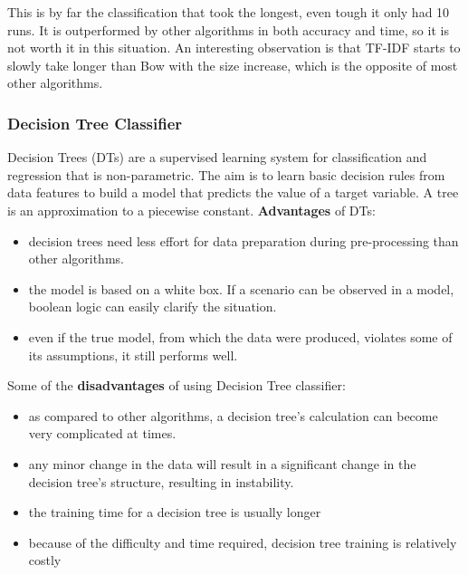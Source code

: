 \documentclass{article}
\begin{document}
	\par This is by far the classification that took the longest, even tough it only had 10 runs. It is outperformed by other algorithms in both accuracy and time, so it is not worth it in this situation. An interesting observation is that TF-IDF starts to slowly take longer than Bow with the size increase, which is the opposite of most other algorithms. 

	\subsubsection{Decision Tree Classifier}
	Decision Trees (DTs) are a supervised learning system for classification and regression that is non-parametric. The aim is to learn basic decision rules from data features to build a model that predicts the value of a target variable. A tree is an approximation to a piecewise constant.
	\textbf{Advantages} of DTs:
\begin{itemize}
\item decision trees need less effort for data preparation during pre-processing than other algorithms.
\item the model is based on a white box. If a scenario can be observed in a model, boolean logic can easily clarify the situation.
\item even if the true model, from which the data were produced, violates some of its assumptions, it still performs well.
\end{itemize}
Some of the \textbf{disadvantages} of using Decision Tree classifier:
\begin{itemize}
\item as compared to other algorithms, a decision tree's calculation can become very complicated at times.
\item any minor change in the data will result in a significant change in the decision tree's structure, resulting in instability.
\item the training time for a decision tree is usually longer
\item because of the difficulty and time required, decision tree training is relatively costly
\end{itemize}
\end{document}
